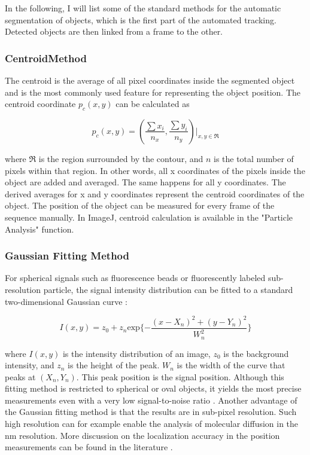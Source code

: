 In the following, I will list some of the standard methods for the
automatic segmentation of objects, which is the first part of the automated
tracking. Detected objects are then linked from a frame to the other.

\subsubsection{CentroidMethod}
The centroid is the average of all pixel coordinates inside the
segmented object and is the most commonly used feature for representing
the object position. The centroid coordinate
$p_{c}(x,y)$ can be calculated as

\begin{equation}
p_{c}(x,y)=(\frac{\sum{x_{i}}}{n_{x}}, \frac{\sum{y_{i}}}{n_{y}})|_{x,y\in\mathfrak{R}}
\end{equation}

where $\mathfrak{R}$
is the region surrounded by the contour, and $n$ is the total
number of pixels within that region. In other words, all x coordinates
of the pixels inside the object are added and averaged. The same
happens for all y coordinates. The derived averages for x and y
coordinates represent the centroid coordinates of the object. The
position of the object can be measured for every frame of the sequence
manually. In ImageJ, centroid calculation is available in the
"Particle Analysis" function.

\subsubsection{Gaussian Fitting Method}

For spherical signals such as fluorescence beads or fluorescently
labeled sub-resolution particle, the signal intensity distribution can
be fitted to a standard two-dimensional Gaussian curve \citep{cmaderson1992, schuetzBJ1997, TardinEJ_2003.pdf}: 

\begin{equation}
I(x,y)=z_{0}+z_{n}\text{exp}\{-\frac{(x-X_{n})^{2}+(y-Y_{n})^{2}}{W_{n}^{2}} \}
\end{equation}

where $I(x, y)$ is the intensity distribution of an image,
$z_0$ is the background intensity, and
$z_n$ is the height of the peak.
$W_n$ is the width of the curve that
peaks at $(X_n, Y_n)$. This peak position is the signal
position. Although this fitting method is restricted to spherical or
oval objects, it yields the most precise measurements even with a very
low signal-to-noise ratio \citep{cheezumBJ2001}. Another advantage of
the Gaussian fitting method is that the results are in sub-pixel
resolution. Such high resolution can for example enable the analysis of
molecular diffusion in the nm resolution. More discussion on the
localization accuracy in the position measurements can be found in the
literature \citep{oberBJ2004, martinBJ2002, ThompsonBJ2002.pdf}.

